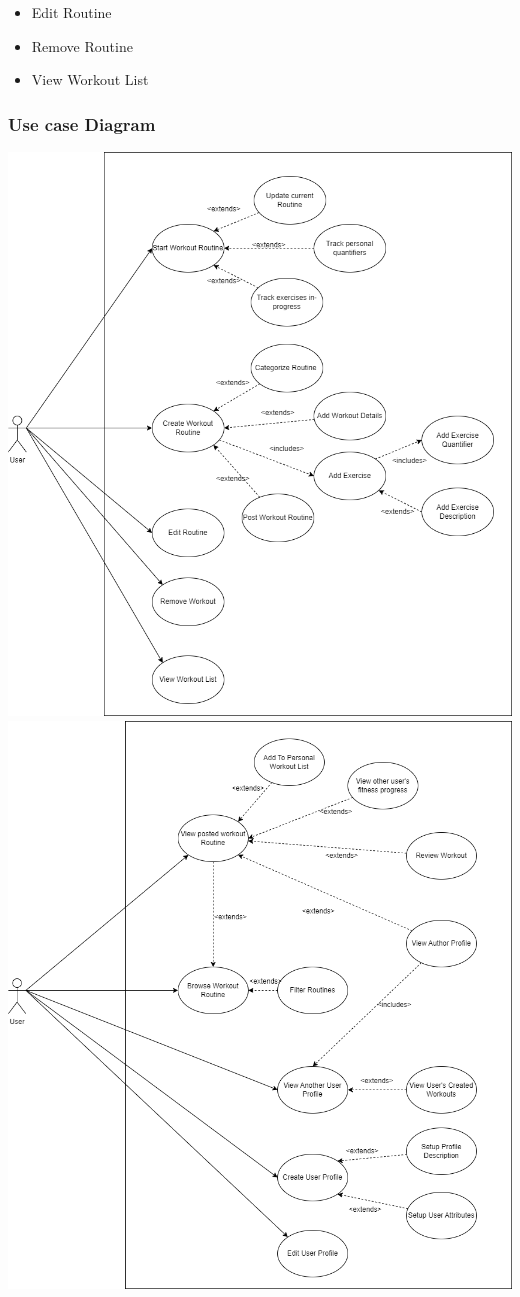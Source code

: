 \documentclass[12pt]{article}
\begin{document}
\begin{itemize}
		\item Edit Routine
		\item Remove Routine
		\item View Workout List
	\end{itemize}
	
	\subsubsection{Use case Diagram}
	\includegraphics[scale=0.5]{srs_usecase_diagram_routines}
	\newpage
	\includegraphics[scale=0.5]{srs_usecase_diagram_profiles}
	
\end{document}
